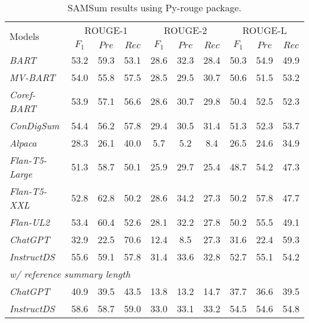 \documentclass[11pt]{article}
\begin{document}
\begin{table*}[t]
        \centering
        \begin{adjustbox}{width=0.90\textwidth,center}
        \begin{tabular}{| l | c  c  c | c  c  c | c  c  c |}
        \toprule
        
        \multirow{2}{*}{Models} & \multicolumn{3}{c}{ROUGE-1} & \multicolumn{3}{c}{ROUGE-2} & \multicolumn{3}{c|}{ROUGE-L} \\
        \cline{2-10}
         & $F_1$ & $Pre$ & $Rec$ & $F_1$ & $Pre$ & $Rec$ & $F_1$ & $Pre$ & $Rec$ \\
        \hline
        \emph{BART} & 53.2 & 59.3 & 53.1 & 28.6 & 32.3 & 28.4 & 50.3 & 54.9 & 49.9 \\
        \emph{MV-BART} & 54.0 & 55.8 & 57.5 & 28.5 & 29.5 & 30.7 & 50.6 & 51.5 & 53.2 \\
        \emph{Coref-BART} & 53.9 & 57.1 & 56.6 & 28.6 & 30.7 & 29.8 & 50.4 & 52.5 & 52.3 \\
        \emph{ConDigSum} & 54.4 & 56.2 & 57.8 & 29.4 & 30.5 & 31.4 & 51.3 & 52.3 & 53.7 \\
        \hline
        \emph{Alpaca} & 28.3 & 26.1 & 40.0 & 5.7 & 5.2 & 8.4 & 26.5 & 24.6 & 34.9 \\
        \emph{Flan-T5-Large} & 51.3 & 58.7 & 50.1 & 25.9 & 29.7 & 25.4 & 48.7 & 54.2 & 47.3 \\
        \emph{Flan-T5-XXL} & 52.8 & 62.8 & 50.2 & 28.6 & 34.2 & 27.3 & 50.2 & 57.8 & 47.7 \\
        \emph{Flan-UL2} & 53.4 & 60.4 & 52.6 & 28.1 & 32.2 & 27.8 & 50.2 & 55.5 & 49.1 \\
        \emph{ChatGPT} & 32.9 & 22.5 & 70.6 & 12.4 & 8.5 & 27.3 & 31.6 & 22.4 & 59.3 \\
        \hline
        \emph{InstructDS} & 55.6 & 59.1 & 57.8 & 31.4 & 33.6 & 32.8 & 52.7 & 55.1 & 54.2 \\ \hline \hline
        \multicolumn{10}{|l|}{\emph{w/ reference summary length}}\\\hline 
        \emph{ChatGPT} & 40.9 & 39.5 & 43.5 & 13.8 & 13.2 & 14.7 & 37.7 & 36.6 & 39.5 \\
        \emph{InstructDS} & 58.6 & 58.7 & 59.0 & 33.0 & 33.1 & 33.2 & 54.5 & 54.6 & 54.8 \\
        \bottomrule
        \end{tabular}
        \end{adjustbox}
        \caption{SAMSum results using Py-rouge package.}
        \label{tab:appendix_samsum_results}
    \end{table*}
\end{document}
